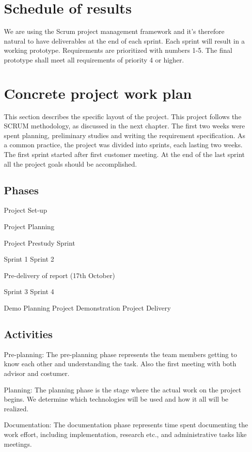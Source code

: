 \documentclass[11pt,a4paper,titlepage,oneside]{report}
\begin{document}
\section{Schedule of results}
We are using the Scrum project management framework and it’s therefore natural to have deliverables at the end of each sprint. Each sprint will result in a working prototype. Requirements are prioritized with numbers 1-5. The final prototype shall meet all requirements of priority 4 or higher.
\section{Concrete project work plan}
This section describes the specific layout of the project. This project follows the SCRUM methodology, as discussed in the next chapter. The first two weeks were spent planning, preliminary studies and writing the requirement specification. As a common practice, the project was divided into sprints, each lasting two weeks. The first sprint started after first customer meeting. At the end of the last sprint all the project goals should be accomplished.
  \subsection{Phases}
  Project Set-up

Project Planning

Project Prestudy Sprint

Sprint 1
Sprint 2

Pre-delivery of report (17th October)

Sprint 3
Sprint 4

Demo Planning
Project Demonstration
Project Delivery

\subsection{Activities}
Pre-planning: The pre-planning phase represents the team members getting to know each other and understanding the task. Also the first meeting with both advisor and costumer.
      
Planning: The planning phase is the stage where the actual work on the project begins. We determine which technologies will be used and how it all will be realized.
          
Documentation: The documentation phase represents time spent documenting the work effort, including implementation, research etc., and administrative tasks like meetings.
          
\end{document}
